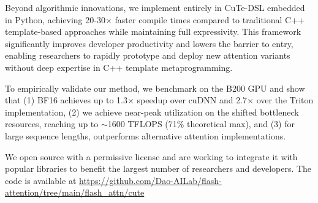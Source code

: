 Beyond algorithmic innovations, we implement \faf entirely in CuTe-DSL embedded in Python, achieving 20-30$\times$ faster compile times compared to traditional C++ template-based approaches while maintaining full expressivity. This framework significantly improves developer productivity and lowers the barrier to entry, enabling researchers to rapidly prototype and deploy new attention variants without deep expertise in C++ template metaprogramming.

To empirically validate our method, we benchmark \faf on the B200 GPU and show that (1) BF16 achieves up to 1.3$\times$ speedup over cuDNN and 2.7$\times$ over the Triton implementation, (2) we achieve near-peak utilization on the shifted bottleneck resources, reaching up to $\sim$1600 TFLOPS (71\% theoretical max), and (3) for large sequence lengths, \faf outperforms alternative attention implementations.


We open source \faf with a permissive license and are working to integrate it with popular libraries to benefit the largest number of researchers and developers. The code is available at \url{https://github.com/Dao-AILab/flash-attention/tree/main/flash_attn/cute}
